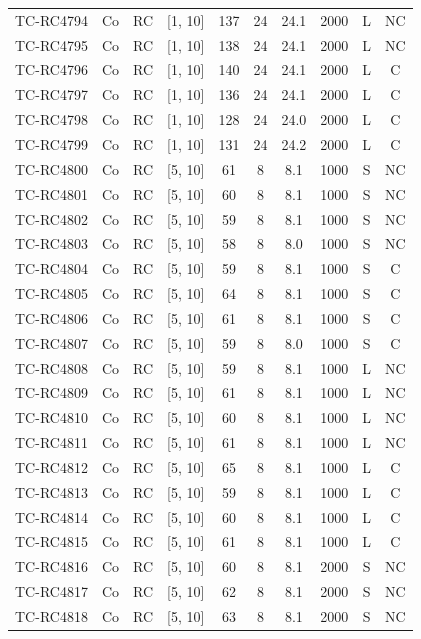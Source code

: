 \begin{longtable}{lccccccccc}
TC-RC4794 & Co & RC & [1, 10] & 137 & 24 & 24.1 & 2000 & L & NC \\
TC-RC4795 & Co & RC & [1, 10] & 138 & 24 & 24.1 & 2000 & L & NC \\
TC-RC4796 & Co & RC & [1, 10] & 140 & 24 & 24.1 & 2000 & L & C \\
TC-RC4797 & Co & RC & [1, 10] & 136 & 24 & 24.1 & 2000 & L & C \\
TC-RC4798 & Co & RC & [1, 10] & 128 & 24 & 24.0 & 2000 & L & C \\
TC-RC4799 & Co & RC & [1, 10] & 131 & 24 & 24.2 & 2000 & L & C \\
TC-RC4800 & Co & RC & [5, 10] & 61 & 8 & 8.1 & 1000 & S & NC \\
TC-RC4801 & Co & RC & [5, 10] & 60 & 8 & 8.1 & 1000 & S & NC \\
TC-RC4802 & Co & RC & [5, 10] & 59 & 8 & 8.1 & 1000 & S & NC \\
TC-RC4803 & Co & RC & [5, 10] & 58 & 8 & 8.0 & 1000 & S & NC \\
TC-RC4804 & Co & RC & [5, 10] & 59 & 8 & 8.1 & 1000 & S & C \\
TC-RC4805 & Co & RC & [5, 10] & 64 & 8 & 8.1 & 1000 & S & C \\
TC-RC4806 & Co & RC & [5, 10] & 61 & 8 & 8.1 & 1000 & S & C \\
TC-RC4807 & Co & RC & [5, 10] & 59 & 8 & 8.0 & 1000 & S & C \\
TC-RC4808 & Co & RC & [5, 10] & 59 & 8 & 8.1 & 1000 & L & NC \\
TC-RC4809 & Co & RC & [5, 10] & 61 & 8 & 8.1 & 1000 & L & NC \\
TC-RC4810 & Co & RC & [5, 10] & 60 & 8 & 8.1 & 1000 & L & NC \\
TC-RC4811 & Co & RC & [5, 10] & 61 & 8 & 8.1 & 1000 & L & NC \\
TC-RC4812 & Co & RC & [5, 10] & 65 & 8 & 8.1 & 1000 & L & C \\
TC-RC4813 & Co & RC & [5, 10] & 59 & 8 & 8.1 & 1000 & L & C \\
TC-RC4814 & Co & RC & [5, 10] & 60 & 8 & 8.1 & 1000 & L & C \\
TC-RC4815 & Co & RC & [5, 10] & 61 & 8 & 8.1 & 1000 & L & C \\
TC-RC4816 & Co & RC & [5, 10] & 60 & 8 & 8.1 & 2000 & S & NC \\
TC-RC4817 & Co & RC & [5, 10] & 62 & 8 & 8.1 & 2000 & S & NC \\
TC-RC4818 & Co & RC & [5, 10] & 63 & 8 & 8.1 & 2000 & S & NC \\

\end{longtable}
